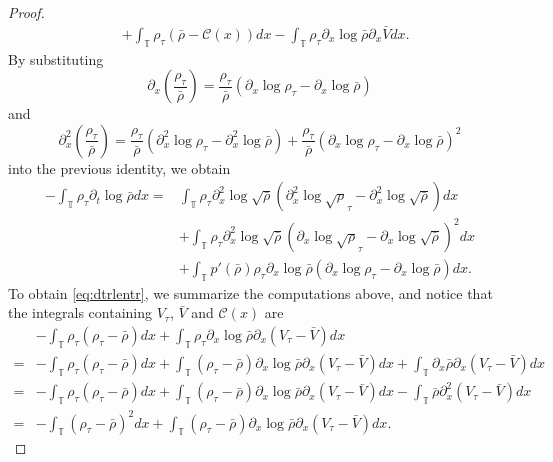 \documentclass[leqno]{amsart}
\theoremstyle{plain}
\theoremstyle{definition}
\theoremstyle{remark}
\theoremstyle{plain}
\theoremstyle{plain}
\def\T{{\mathbb T}}%
\def\d{{\partial}}
\numberwithin{equation}{section}
\begin{document}
\begin{proof}
\begin{align*}
&+\int_\T \rho_\tau(\bar\rho-\mathcal{C}(x))dx-\int_\T \rho_\tau\d_x\log\bar\rho\d_x\bar Vdx.
\end{align*}
By substituting 
\[
\d_x\left(\frac{\rho_\tau}{\bar\rho}\right)=\frac{\rho_\tau}{\bar\rho}(\d_x\log\rho_\tau-\d_x\log\bar\rho)
\]
and
\[
\d_x^2\left(\frac{\rho_\tau}{\bar\rho}\right)=\frac{\rho_\tau}{\bar\rho}(\d_x^2\log\rho_\tau-\d_x^2\log\bar\rho)+\frac{\rho_\tau}{\bar\rho}(\d_x\log\rho_\tau-\d_x\log\bar\rho)^2
\]
into the previous identity, we obtain
\begin{align*}
-\int_\T \rho_\tau\d_t\log\bar\rho dx=&\int_\T \rho_\tau\d_x^2\log\sqrt{\bar\rho}(\d_x^2\log\sqrt\rho_\tau-\d_x^2\log\sqrt{\bar\rho})dx\\
&+\int_\T \rho_\tau\d_x^2\log\sqrt{\bar\rho}(\d_x\log\sqrt\rho_\tau-\d_x\log\sqrt{\bar\rho})^2dx\\
&+\int_\T p'(\bar\rho)\rho_\tau\d_x\log\bar\rho(\d_x\log\rho_\tau-\d_x\log\bar\rho)dx.
\end{align*}
To obtain \eqref{eq:dtrlentr}, we summarize the computations above, and notice that the integrals containing $V_\tau$, $\bar V$ and $\mathcal{C}(x)$ are
\begin{align*}
&-\int_\T\rho_\tau(\rho_\tau-\bar\rho)dx+\int_\T\rho_\tau\d_x\log\bar\rho\d_x(V_\tau-\bar V)dx\\
=&-\int_\T\rho_\tau(\rho_\tau-\bar\rho)dx+\int_\T(\rho_\tau-\bar\rho)\d_x\log\bar\rho\d_x(V_\tau-\bar V)dx+\int_\T\d_x\bar\rho\d_x(V_\tau-\bar V)dx\\
=&-\int_\T\rho_\tau(\rho_\tau-\bar\rho)dx+\int_\T(\rho_\tau-\bar\rho)\d_x\log\bar\rho\d_x(V_\tau-\bar V)dx-\int_\T\bar\rho\d_x^2(V_\tau-\bar V)dx\\
=&-\int_\T(\rho_\tau-\bar\rho)^2dx+\int_\T(\rho_\tau-\bar\rho)\d_x\log\bar\rho\d_x(V_\tau-\bar V)dx.
\end{align*}
\end{proof}
\end{document}
